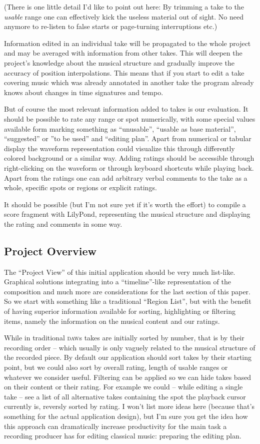 \documentclass[11pt,a4paper]{article}
\begin{document}
(There is one little detail I'd like to point out here: By trimming a take to the \emph{usable} range one can effectively kick the useless material out of sight.
No need anymore to re-listen to false starts or page-turning interruptions etc.)

Information edited in an individual take will be propagated to the whole project and may be averaged with information from other takes.
This will deepen the project's knowledge about the musical structure and gradually improve the accuracy of position interpolations.
This means that if you start to edit a take covering music which was already annotated in another take the program already knows about changes in time signatures and tempo.

But of course the most relevant information added to takes is our evaluation.
It should be possible to rate any range or spot numerically, with some special values available form marking something as “unusable”, “usable as base material”, “suggested” or ”to be used” and “editing plan”.
Apart from numerical or tabular display the waveform representation could visualize this through differently colored background or a similar way.
Adding ratings should be accessible through right-clicking on the waveform or through keyboard shortcuts while playing back.
Apart from the ratings one can add arbitrary verbal comments to the take as a whole, specific spots or regions or explicit ratings.

It should be possible (but I'm not sure yet if it's worth the effort) to compile a score fragment with LilyPond, representing the musical structure and displaying the rating and comments in some way.

\subsection{Project Overview}
The “Project View” of this initial application should be very much list-like.
Graphical solutions integrating into a “timeline”-like representation of the composition and much more are considerations for the last section of this paper.
So we start with something like a traditional “Region List”, but with the benefit of having superior information available for sorting, highlighting or filtering items, namely the information on the musical content and our ratings.

While in traditional \textsc{daw}s takes are initially sorted by number, that is by their recording order -- which usually is only vaguely related to the musical structure of the recorded piece.
By default our application should sort takes by their starting point, but we could also sort by overall rating, length of usable ranges or whatever we consider useful.
Filtering can be applied so we can hide takes based on their content or their rating.
For example we could -- while editing a single take -- see a list of all alternative takes containing the spot the playback cursor currently is, reversly sorted by rating.
I won't list more ideas here (because that's something for the actual application design), but I'm sure you get the idea how this approach can dramatically increase productivity for the main task a recording producer has for editing classical music: preparing the editing plan.
\end{document}
